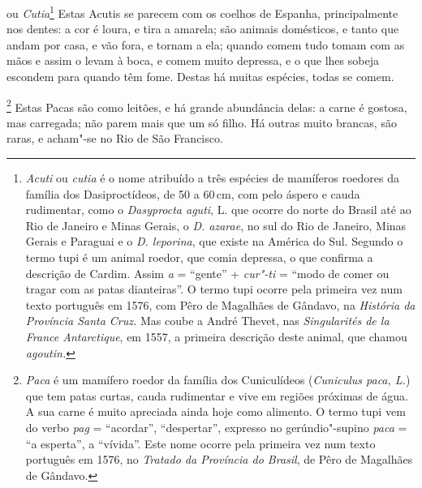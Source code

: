  ou \textit{Cutia}\footnote{ \textit{Acuti} ou
\textit{cutia} é o nome atribuído a três espécies de mamíferos
roedores da família dos Dasiproctídeos, de 50 a 60\,cm, com pelo áspero e
cauda rudimentar, como o \textit{Dasyprocta aguti}, L. que ocorre do
norte do Brasil até ao Rio de Janeiro e Minas Gerais, o \textit{D.
azarae}, no sul do Rio de Janeiro, Minas Gerais e Paraguai e o
\textit{D. leporina}, que existe na América do Sul. Segundo o
termo tupi é um animal roedor, que comia depressa, o que confirma a
descrição de Cardim. Assim \textit{a} = ``gente'' + \textit{cur"-ti} = 
``modo de comer ou tragar com as patas dianteiras''. O termo tupi ocorre
pela primeira vez num texto português em 1576, com Pêro de Magalhães de
Gândavo, na \textit{História da Província Santa Cruz.} Mas coube a
André Thevet, nas \textit{Singularités de la France Antarctique}, em
1557, a primeira descrição deste animal, que chamou
\textit{agoutin.}} Estas Acutis se parecem com os coelhos de
Espanha, principalmente nos dentes: a cor é loura, e tira a amarela;
são animais domésticos, e tanto que andam por casa, e vão fora, e
tornam a ela; quando comem tudo tomam com as mãos e assim o levam à
boca, e comem muito depressa, e o que lhes sobeja escondem para quando
têm fome. Destas há muitas espécies, todas se comem. 

\footnote{ \textit{Paca} é um mamífero
roedor da família dos Cuniculídeos (\textit{Cuniculus paca, L.}) que
tem patas curtas, cauda rudimentar e vive em regiões próximas de água.
A sua carne é muito apreciada ainda hoje como alimento. O termo tupi
vem do verbo \textit{pag} = ``acordar'', ``despertar'', expresso no
gerúndio"-supino \textit{paca} = ``a esperta'', a ``vívida''. Este nome
ocorre pela primeira vez num texto português em 1576, no
\textit{Tratado da Província do Brasil}, de Pêro de Magalhães de Gândavo.}
Estas Pacas são como leitões, e há grande abundância delas:
a carne é gostosa, mas carregada; não parem mais que um só filho. Há
outras muito brancas, são raras, e acham"-se no Rio de São Francisco. 

